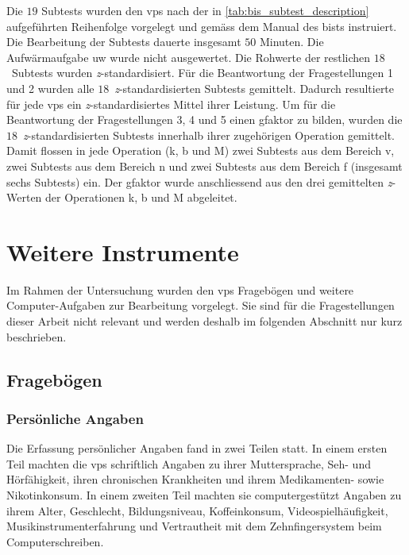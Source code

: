 \documentclass[11pt, twoside, a4paper]{book}		%
\begin{document}
Die $19$ Subtests wurden den \glspl{vp} nach der in \autoref{tab:bis_subtest_description} aufgeführten Reihenfolge vorgelegt und gemäss dem Manual des \gls{bist}s instruiert. 
Die Bearbeitung der Subtests dauerte insgesamt $50$ Minuten.
Die Aufwärmaufgabe \gls{uw} wurde nicht ausgewertet. Die Rohwerte der restlichen $18$~Subtests wurden \textit{z}-standardisiert. 
Für die Beantwortung der Fragestellungen 1 und 2 wurden alle $18$~\textit{z}-stand\-ard\-isier\-ten Subtests gemittelt. Dadurch resultierte für jede \glspl{vp} ein \textit{z}-standardisiertes Mittel ihrer Leistung. 
Um für die Beantwortung der Fragestellungen 3, 4 und 5 einen \gls{gfaktor} zu bilden, wurden die $18$~\textit{z}-standardisierten Subtests innerhalb ihrer zugehörigen Operation gemittelt. Damit flossen in jede Operation (\gls{k}, \gls{b} und \gls{M}) zwei Subtests aus dem Bereich \gls{v}, zwei Subtests aus dem Bereich \gls{n} und zwei Subtests aus dem Bereich \gls{f} (insgesamt sechs Subtests) ein. Der \gls{gfaktor} wurde anschliessend aus den drei gemittelten \textit{z}-Werten der Operationen \gls{k}, \gls{b} und \gls{M} abgeleitet.


\section{Weitere Instrumente}

Im Rahmen der Untersuchung wurden den \glspl{vp} Fragebögen und weitere Com\-put\-er-Auf\-gaben zur Bearbeitung vorgelegt. Sie sind für die Fragestellungen dieser Arbeit nicht relevant und werden deshalb im folgenden Abschnitt nur kurz beschrieben.


\subsection{Fragebögen}

\subsubsection*{Persönliche Angaben}
Die Erfassung persönlicher Angaben fand in zwei Teilen statt. In einem ersten Teil machten die \glspl{vp} schriftlich Angaben zu ihrer Muttersprache, Seh- und Hörfähigkeit, ihren chronischen Krankheiten und ihrem Medikamenten- sowie Nikotinkonsum. In einem zweiten Teil machten sie computergestützt Angaben zu ihrem Alter, Geschlecht, Bildungsniveau, Koffeinkonsum,  Videospielhäufigkeit, Musikinstrumenterfahrung und Vertrautheit mit dem Zehnfingersystem beim Computerschreiben.
\end{document}
